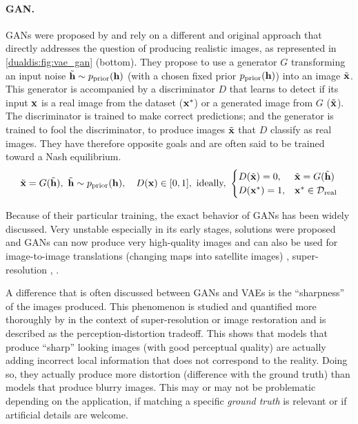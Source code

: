 \paragraph{\acl{GAN}.} \acp{GAN} were proposed by \citet{Goodfellow2014} and rely on a different and original approach that directly addresses the question of producing realistic images, as represented in \autoref{dualdis:fig:vae_gan} (bottom). They propose to use a generator $G$ transforming an input noise $\tilde{\mathbf{h}} \sim p_\mathrm{prior}(\mathbf{h})$ (with a chosen fixed prior $p_\mathrm{prior}(\mathbf{h})$) into an image $\tilde{\mathbf{x}}$. This generator is accompanied by a discriminator $D$ that learns to detect if its input $\mathbf{x}$ is a real image from the dataset ($\mathbf{x}^*$) or a generated image from $G$ ($\tilde{\mathbf{x}}$). The discriminator is trained to make correct predictions; and the generator is trained to fool the discriminator, \ie to produce images $\tilde{\mathbf{x}}$ that $D$ classify as real images. They have therefore opposite goals and are often said to be trained toward a Nash equilibrium.
\begin{equation}
    \tilde{\mathbf{x}} = G(\tilde{\mathbf{h}}),\ \tilde{\mathbf{h}}\sim p_\mathrm{prior}(\mathbf{h}), \quad
    D(\mathbf{x}) \in [0,1],\ \text{ideally, } \begin{cases}
    D(\tilde {\mathbf{x}}) = 0, & \tilde {\mathbf{x}} = G(\tilde{\mathbf{h}})\\
    D(\mathbf{x}^*) = 1, & \mathbf{x}^* \in \mathcal{D}_\mathrm{real}
\end{cases}
\end{equation}

Because of their particular training, the exact behavior of \acp{GAN} has been widely discussed. Very unstable especially in its early stages, solutions were proposed \citep{kodali2017convergence,roth2017stabilizing} and \acp{GAN} can now produce very high-quality images \citep{karras2017progressive,karras2018style} and can also be used for image-to-image translations (\eg changing maps into satellite images) \citep{zhu2017unpaired,choi2018stargan}, super-resolution \citep{ledig2017photo}, \etc.

A difference that is often discussed between \acp{GAN} and \acp{VAE} is the ``sharpness'' of the images produced. This phenomenon is studied and quantified more thoroughly by \citet{blau2018perception} in the context of super-resolution or image restoration and is described as the perception-distortion tradeoff. This shows that models that produce ``sharp'' looking images (\ie with good perceptual quality) are actually adding incorrect local information that does not correspond to the reality. Doing so, they actually produce more distortion (\ie difference with the ground truth) than models that produce blurry images. This may or may not be problematic depending on the application, \ie if matching a specific \textit{ground truth} is relevant or if artificial details are welcome.

